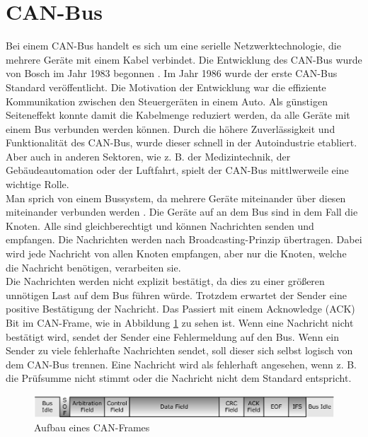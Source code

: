 \section{CAN-Bus}
Bei einem CAN-Bus handelt es sich um eine serielle Netzwerktechnologie, 
die mehrere Geräte mit einem Kabel verbindet.
Die Entwicklung des CAN-Bus wurde von Bosch im Jahr 1983 begonnen \cite[Seiten 2--10]{Voss2008}. 
Im Jahr 1986 wurde der erste CAN-Bus Standard 
veröffentlicht.
Die Motivation der Entwicklung war die effiziente Kommunikation zwischen den Steuergeräten in einem Auto. 
Als günstigen
Seiteneffekt konnte damit die Kabelmenge reduziert werden, da alle Geräte mit einem Bus verbunden werden können.
Durch die höhere Zuverlässigkeit und Funktionalität des CAN-Bus, wurde dieser schnell in der Autoindustrie etabliert.
Aber auch in anderen Sektoren, wie z. B. der Medizintechnik, der Gebäudeautomation oder der Luftfahrt, spielt der
CAN-Bus mittlwerweile eine wichtige Rolle.
\\
Man sprich von einem Bussystem, da mehrere Geräte miteinander über diesen miteinander verbunden werden \cite[Seiten 13--19]{Voss2008}. 
Die Geräte auf an dem Bus sind in dem Fall die Knoten. Alle sind gleichberechtigt und können Nachrichten senden und empfangen.
Die Nachrichten werden nach Broadcasting-Prinzip übertragen. Dabei wird jede Nachricht von allen Knoten empfangen, 
aber nur die Knoten, welche die Nachricht benötigen, verarbeiten sie. \\
Die Nachrichten werden nicht explizit bestätigt, da dies zu einer größeren unnötigen Last auf dem Bus führen würde.
Trotzdem erwartet der Sender eine positive Bestätigung der Nachricht. Das Passiert mit einem Acknowledge (ACK) Bit 
im CAN-Frame, wie in Abbildung \ref{fig:canframe} zu sehen ist. Wenn eine Nachricht nicht bestätigt wird, 
sendet der Sender eine Fehlermeldung auf den Bus. Wenn ein Sender zu viele fehlerhafte Nachrichten sendet, soll
dieser sich selbst logisch von dem CAN-Bus trennen. Eine Nachricht wird als fehlerhaft angesehen, wenn z. B. die Prüfsumme
nicht stimmt oder die Nachricht nicht dem Standard entspricht.

\begin{figure}[H]
    \centering
    \includegraphics[scale=0.25]{images/canFrame.png}
    \caption{Aufbau eines CAN-Frames \cite{Voss2008}}
    \label{fig:canframe}
\end{figure}

